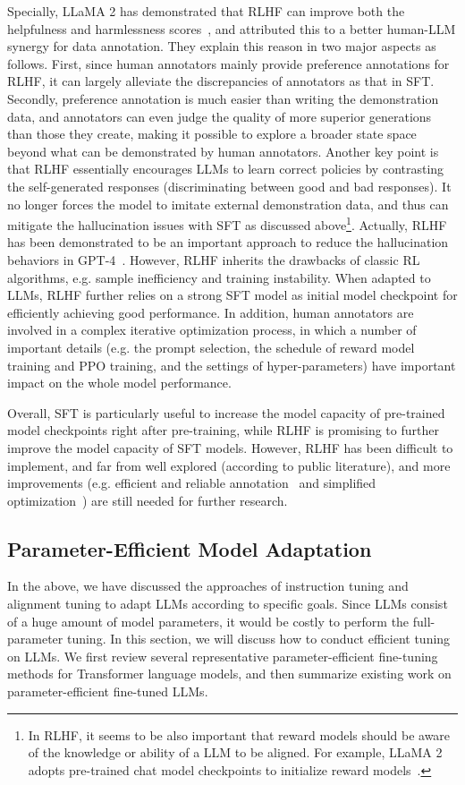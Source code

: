Specially, LLaMA 2 has demonstrated that RLHF can improve both the helpfulness and harmlessness scores~\cite{Touvron-2023-llama2-arxiv}, and  attributed this to a better human-LLM synergy for data annotation. They explain this reason in two major aspects as follows. First, since human annotators mainly provide preference annotations for RLHF, it can largely alleviate the discrepancies of annotators as that in SFT. Secondly, preference annotation is much easier than writing the demonstration data, and annotators can even judge the quality of more superior generations than those they create, making it possible to explore a broader state space beyond what can be demonstrated by human annotators. Another key point is that RLHF essentially encourages LLMs to learn correct policies by contrasting the  self-generated responses (discriminating between good and bad responses). It no longer forces the model to imitate external demonstration data, and thus can mitigate the hallucination issues with SFT as discussed above\footnote{In RLHF,  it seems to be also important  that reward models should be aware of the knowledge or ability of a LLM to be aligned. For example, LLaMA 2 adopts pre-trained chat model checkpoints  to initialize reward models~\cite{Touvron-2023-llama2-arxiv}. }. Actually, RLHF has been demonstrated to be an important approach to reduce the  hallucination behaviors in GPT-4~\cite{OpenAI-OpenAI-2023-GPT-4}. However, RLHF inherits the drawbacks of classic RL algorithms, e.g. sample  inefficiency and training instability. When adapted to LLMs, RLHF further  relies on a strong SFT model as initial model checkpoint for efficiently achieving good performance. In addition, human annotators are involved in a complex iterative optimization process, in which a number of important details (e.g. the prompt selection, the schedule of reward model training and PPO training, and the settings of hyper-parameters) have important impact on the whole model performance.   

Overall, SFT is particularly useful to increase the model capacity of pre-trained model checkpoints right after pre-training, while RLHF is promising to further improve the model capacity of SFT models. However, RLHF has been difficult to implement, and far from well explored (according to public literature), and more improvements (e.g. efficient and reliable annotation~\cite{Bai-arXiv-2022-Constitutional} and simplified optimization~\cite{Rafailov-arxiv-2023-Direct}) are still needed for further   research. 

\subsection{Parameter-Efficient Model Adaptation}\label{sec-PEFT}
In the above, we have discussed the approaches of instruction tuning and alignment tuning to adapt LLMs according to specific goals. Since  LLMs consist of a huge amount of model parameters, it would be costly to perform the full-parameter tuning. In this section, we will discuss how to conduct efficient tuning  on LLMs.  We first review several representative parameter-efficient fine-tuning methods for Transformer language models, and then summarize existing work on parameter-efficient fine-tuned LLMs. 

